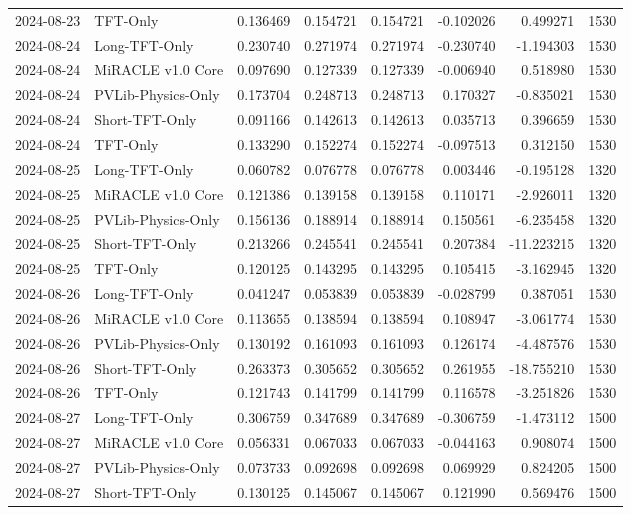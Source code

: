 \begin{tabular}{llrrrrrr}
2024-08-23 & TFT-Only & 0.136469 & 0.154721 & 0.154721 & -0.102026 & 0.499271 & 1530 \\
2024-08-24 & Long-TFT-Only & 0.230740 & 0.271974 & 0.271974 & -0.230740 & -1.194303 & 1530 \\
2024-08-24 & MiRACLE v1.0 Core & 0.097690 & 0.127339 & 0.127339 & -0.006940 & 0.518980 & 1530 \\
2024-08-24 & PVLib-Physics-Only & 0.173704 & 0.248713 & 0.248713 & 0.170327 & -0.835021 & 1530 \\
2024-08-24 & Short-TFT-Only & 0.091166 & 0.142613 & 0.142613 & 0.035713 & 0.396659 & 1530 \\
2024-08-24 & TFT-Only & 0.133290 & 0.152274 & 0.152274 & -0.097513 & 0.312150 & 1530 \\
2024-08-25 & Long-TFT-Only & 0.060782 & 0.076778 & 0.076778 & 0.003446 & -0.195128 & 1320 \\
2024-08-25 & MiRACLE v1.0 Core & 0.121386 & 0.139158 & 0.139158 & 0.110171 & -2.926011 & 1320 \\
2024-08-25 & PVLib-Physics-Only & 0.156136 & 0.188914 & 0.188914 & 0.150561 & -6.235458 & 1320 \\
2024-08-25 & Short-TFT-Only & 0.213266 & 0.245541 & 0.245541 & 0.207384 & -11.223215 & 1320 \\
2024-08-25 & TFT-Only & 0.120125 & 0.143295 & 0.143295 & 0.105415 & -3.162945 & 1320 \\
2024-08-26 & Long-TFT-Only & 0.041247 & 0.053839 & 0.053839 & -0.028799 & 0.387051 & 1530 \\
2024-08-26 & MiRACLE v1.0 Core & 0.113655 & 0.138594 & 0.138594 & 0.108947 & -3.061774 & 1530 \\
2024-08-26 & PVLib-Physics-Only & 0.130192 & 0.161093 & 0.161093 & 0.126174 & -4.487576 & 1530 \\
2024-08-26 & Short-TFT-Only & 0.263373 & 0.305652 & 0.305652 & 0.261955 & -18.755210 & 1530 \\
2024-08-26 & TFT-Only & 0.121743 & 0.141799 & 0.141799 & 0.116578 & -3.251826 & 1530 \\
2024-08-27 & Long-TFT-Only & 0.306759 & 0.347689 & 0.347689 & -0.306759 & -1.473112 & 1500 \\
2024-08-27 & MiRACLE v1.0 Core & 0.056331 & 0.067033 & 0.067033 & -0.044163 & 0.908074 & 1500 \\
2024-08-27 & PVLib-Physics-Only & 0.073733 & 0.092698 & 0.092698 & 0.069929 & 0.824205 & 1500 \\
2024-08-27 & Short-TFT-Only & 0.130125 & 0.145067 & 0.145067 & 0.121990 & 0.569476 & 1500 \\

\end{tabular}
